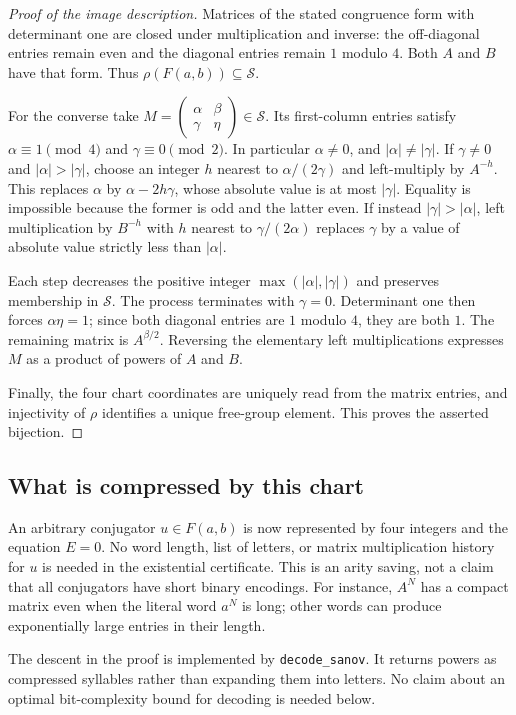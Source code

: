 \documentclass[11pt,letterpaper]{article}
\theoremstyle{definition}
\theoremstyle{remark}
\newcommand{\F}{F(a,b)}
\newcommand{\San}{\mathcal S}
\newcommand{\smallmat}[4]{\begin{pmatrix}#1&#2\\#3&#4\end{pmatrix}}
\begin{document}
\begin{proof}[Proof of the image description]
Matrices of the stated congruence form with determinant one are closed under multiplication and inverse: the off-diagonal entries remain even and the diagonal entries remain $1$ modulo $4$. Both $A$ and $B$ have that form. Thus $\rho(\F)\subseteq\San$.

For the converse take
$M=\smallmat{\alpha}{\beta}{\gamma}{\eta}\in\San$.
Its first-column entries satisfy $\alpha\equiv1\pmod4$ and
$\gamma\equiv0\pmod2$. In particular $\alpha\ne0$, and
$|\alpha|\ne|\gamma|$.
If $\gamma\ne0$ and $|\alpha|>|\gamma|$, choose an integer $h$ nearest to $\alpha/(2\gamma)$ and left-multiply by $A^{-h}$. This replaces $\alpha$ by $\alpha-2h\gamma$, whose absolute value is at most $|\gamma|$. Equality is impossible because the former is odd and the latter even. If instead $|\gamma|>|\alpha|$, left multiplication by $B^{-h}$ with $h$ nearest to $\gamma/(2\alpha)$ replaces $\gamma$ by a value of absolute value strictly less than $|\alpha|$.

Each step decreases the positive integer
$\max(|\alpha|,|\gamma|)$ and preserves membership in $\San$.
The process terminates with $\gamma=0$. Determinant one then forces
$\alpha\eta=1$; since both diagonal entries are $1$ modulo $4$, they are both $1$. The remaining matrix is $A^{\beta/2}$.
Reversing the elementary left multiplications expresses $M$ as a product of powers of $A$ and $B$.

Finally, the four chart coordinates are uniquely read from the matrix entries, and injectivity of $\rho$ identifies a unique free-group element. This proves the asserted bijection.
\end{proof}

\subsection{What is compressed by this chart}

An arbitrary conjugator $u\in\F$ is now represented by four integers and the equation $E=0$. No word length, list of letters, or matrix multiplication history for $u$ is needed in the existential certificate. This is an arity saving, not a claim that all conjugators have short binary encodings. For instance, $A^N$ has a compact matrix even when the literal word $a^N$ is long; other words can produce exponentially large entries in their length.

The descent in the proof is implemented by \texttt{decode\_sanov}. It returns powers as compressed syllables rather than expanding them into letters. No claim about an optimal bit-complexity bound for decoding is needed below.
\end{document}
